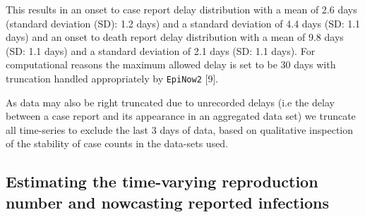 \documentclass[
]{article}
\begin{document}
This results in an onset to case report delay distribution with a mean
of 2.6 days (standard deviation (SD): 1.2 days) and a standard deviation
of 4.4 days (SD: 1.1 days) and an onset to death report delay
distribution with a mean of 9.8 days (SD: 1.1 days) and a standard
deviation of 2.1 days (SD: 1.1 days). For computational reasons the
maximum allowed delay is set to be 30 days with truncation handled
appropriately by \texttt{EpiNow2} {[}9{]}.

As data may also be right truncated due to unrecorded delays (i.e the
delay between a case report and its appearance in an aggregated data
set) we truncate all time-series to exclude the last 3 days of data,
based on qualitative inspection of the stability of case counts in the
data-sets used.

\hypertarget{estimating-the-time-varying-reproduction-number-and-nowcasting-reported-infections}{%
\subsection{Estimating the time-varying reproduction number and
nowcasting reported
infections}\label{estimating-the-time-varying-reproduction-number-and-nowcasting-reported-infections}}
\end{document}
